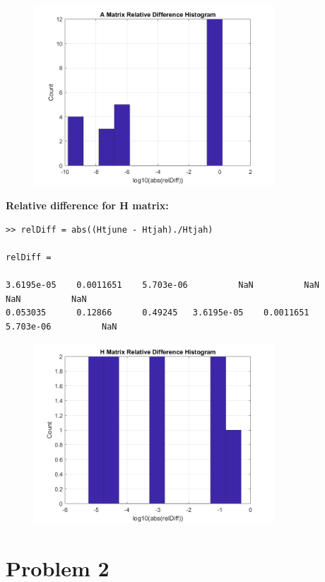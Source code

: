\documentclass[conf]{new-aiaa}
\begin{document}
\begin{figure}[H]
	\centering
	\includegraphics[width=0.8\textwidth]{prob1_A_hist.png}
\end{figure}

\textbf{Relative difference for H matrix:}
\begin{lstlisting}
>> relDiff = abs((Htjune - Htjah)./Htjah)

relDiff =

3.6195e-05    0.0011651    5.703e-06          NaN          NaN          NaN          NaN
0.053035      0.12866      0.49245   3.6195e-05    0.0011651    5.703e-06          NaN
\end{lstlisting}

\begin{figure}[H]
\centering
\includegraphics[width=0.8\textwidth]{prob1_H_hist.png}
\end{figure}


\section*{Problem 2}
\end{document}
